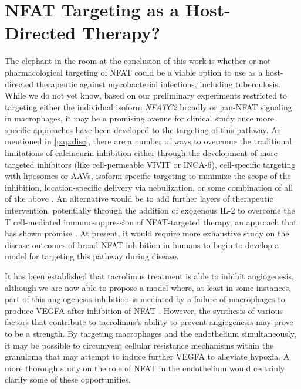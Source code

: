 \section{NFAT Targeting as a Host\hyp{}Directed Therapy?}\label{nfathdt}

The elephant in the room at the conclusion of this work is whether or not pharmacological targeting of NFAT could be a viable option to use as a host\hyp{}directed therapeutic against mycobacterial infections, including tuberculosis. While we do not yet know, based on our preliminary experiments restricted to targeting either the individual isoform \textit{NFATC2} broadly or pan\hyp{}NFAT signaling in macrophages, it may be a promising avenue for clinical study once more specific approaches have been developed to the targeting of this pathway. As mentioned in \autoref{pap:disc}, there are a number of ways to overcome the traditional limitations of calcineurin inhibition either through the development of more targeted inhibitors (like cell\hyp{}permeable VIVIT or INCA\hyp{}6), cell\hyp{}specific targeting with liposomes or AAVs, isoform\hyp{}specific targeting to minimize the scope of the inhibition, location\hyp{}specific delivery via nebulization, or some combination of all of the above \citep{Roehrl2004a, Roehrl2004b, Colombo2022, Kitamura2021, Aramburu1999}. An alternative would be to add further layers of therapeutic intervention, potentially through the addition of exogenous IL\hyp{}2 to overcome the T cell\hyp{}mediated immunosuppression of NFAT\hyp{}targeted therapy, an approach that has shown promise \citep{Whitehouse2017}. At present, it would require more exhaustive study on the disease outcomes of broad NFAT inhibition in humans to begin to develop a model for targeting this pathway during disease.

It has been established that tacrolimus treatment is able to inhibit angiogenesis, although we are now able to propose a model where, at least in some instances, part of this angiogenesis inhibition is mediated by a failure of macrophages to produce VEGFA after inhibition of NFAT \citep{Shen2022, Turgut2011}. However, the synthesis of various factors that contribute to tacrolimus's ability to prevent angiogenesis may prove to be a strength. By targeting macrophages and the endothelium simultaneously, it may be possible to circumvent cellular resistance mechanisms within the granuloma that may attempt to induce further VEGFA to alleviate hypoxia. A more thorough study on the role of NFAT in the endothelium would certainly clarify some of these opportunities. 

